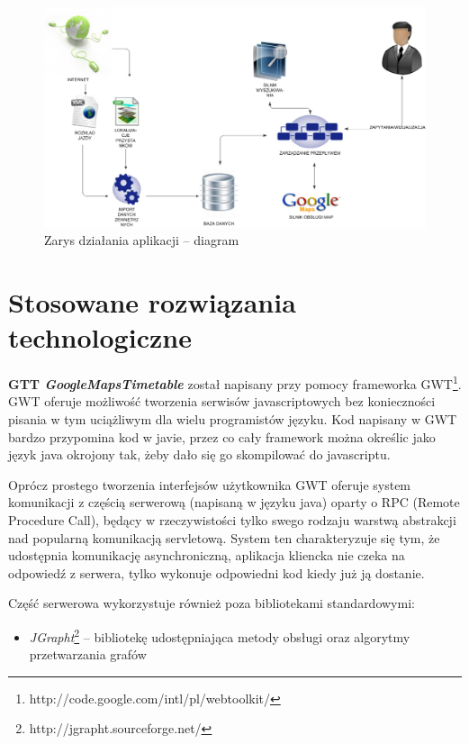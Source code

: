 \documentclass[a4paper,12pt]{article}
\begin{document}
 \begin{figure}[htp]
\centering
\includegraphics[width=\textwidth]{dzialanie_systemu} 
\caption{Zarys działania aplikacji -- diagram}\label{dzialanie_systemu}
\end{figure}

\section{Stosowane rozwiązania technologiczne}
\textbf{GTT \emph{GoogleMapsTimetable}} został napisany przy pomocy frameworka
GWT\footnote{http://code.google.com/intl/pl/webtoolkit/}. GWT oferuje możliwość
tworzenia serwisów javascriptowych bez konieczności pisania w tym uciążliwym
dla wielu programistów języku. Kod napisany w GWT bardzo przypomina kod w javie,
przez co cały framework można określic jako język java okrojony tak, żeby dało się
go skompilować do javascriptu.

Oprócz prostego tworzenia interfejsów użytkownika
GWT oferuje system komunikacji z częścią serwerową (napisaną w języku java) oparty
o RPC (Remote Procedure Call), będący w rzeczywistości tylko swego rodzaju warstwą
abstrakcji nad popularną komunikacją servletową. System ten charakteryzuje się tym,
że udostępnia komunikację asynchroniczną, aplikacja kliencka nie czeka na odpowiedź
z serwera, tylko wykonuje odpowiedni kod kiedy już ją dostanie.

Część serwerowa wykorzystuje również poza bibliotekami standardowymi:
\begin{itemize}
  \item \emph{JGrapht}\footnote{http://jgrapht.sourceforge.net/} -- bibliotekę
  udostępniająca metody obsługi oraz algorytmy przetwarzania grafów
\end{itemize}
\end{document}
